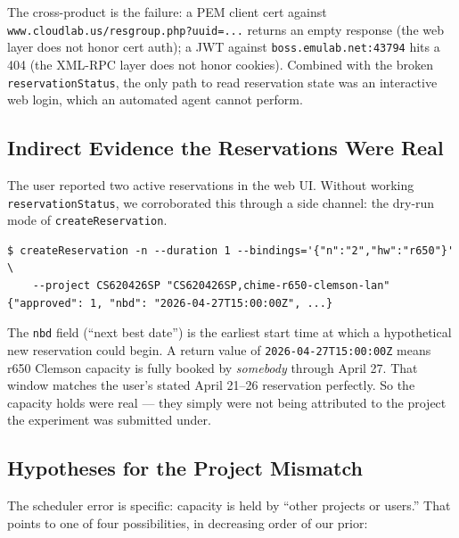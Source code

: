 \documentclass[11pt,a4paper]{article}
\begin{document}
The cross-product is the failure: a PEM client cert against \texttt{www.cloudlab.us/resgroup.php?uuid=...} returns an empty response (the web layer does not honor cert auth); a JWT against \texttt{boss.emulab.net:43794} hits a 404 (the XML-RPC layer does not honor cookies). Combined with the broken \texttt{reservationStatus}, the only path to read reservation state was an interactive web login, which an automated agent cannot perform.

\subsection{Indirect Evidence the Reservations Were Real}

The user reported two active reservations in the web UI. Without working \texttt{reservationStatus}, we corroborated this through a side channel: the dry-run mode of \texttt{createReservation}.

\begin{lstlisting}
$ createReservation -n --duration 1 --bindings='{"n":"2","hw":"r650"}' \
    --project CS620426SP "CS620426SP,chime-r650-clemson-lan"
{"approved": 1, "nbd": "2026-04-27T15:00:00Z", ...}
\end{lstlisting}

The \texttt{nbd} field (``next best date'') is the earliest start time at which a hypothetical new reservation could begin. A return value of \texttt{2026-04-27T15:00:00Z} means r650 Clemson capacity is fully booked by \emph{somebody} through April 27. That window matches the user's stated April 21--26 reservation perfectly. So the capacity holds were real --- they simply were not being attributed to the project the experiment was submitted under.

\subsection{Hypotheses for the Project Mismatch}

The scheduler error is specific: capacity is held by ``other projects or users.'' That points to one of four possibilities, in decreasing order of our prior:
\end{document}
